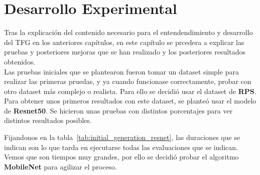\chapter{Desarrollo Experimental}\label{ch:desarrollo_experimental}

Tras la explicación del contenido necesario para el entendendimiento y desarrollo del TFG en los anteriores capítulos,
en este capítulo se prcedera a explicar las pruebas y posteriores mejoras que se han realizado y los posteriores
resultados obtenidos. \\[6pt]

Las pruebas iniciales que se plantearon fueron tomar un dataset simple para realizar las primeras pruedas, y ya cuando
funcionase correctamente, probar con otro dataset más complejo o realista.
Para ello se decidió usar el dataset de \textbf{RPS}. \\[6pt]

Para obtener unos primeros resultados con este dataset, se planteó usar el modelo de \textbf{Resnet50}.
Se hicieron unas pruebas con distintos porcentajes para ver distintos resultados posibles.

\begin{table}[htp]
    \centering
    \caption{Resultados de la generación inicial con \textbf{Resnet50}}
    \label{tab:initial_generation_resnet}
\end{table}

Fijandonos en la tabla~\ref{tab:initial_generation_resnet}, las duraciones que se indican son lo que tarda en
ejecutarse todas las evaluaciones que se indican.
Vemos que son tiempos muy grandes, por ello se decidió probar el algoritmo \textbf{MobileNet} para agilizar el proceso.

